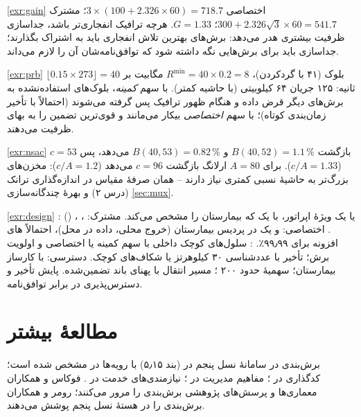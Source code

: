 \documentclass[11pt,a4paper]{article}
\begin{document}
\begin{solutionbox}{\ref{exr:gain}}
اختصاصی $3\times(100 + 2.326\times60) = 718.7$؛ مشترک $300 + 2.326\sqrt3\times60 = 541.7$؛ $G = 1.33$. هرچه ترافیک انفجاری‌تر باشد، جداسازی ظرفیت
بیشتری هدر می‌دهد: برش‌های بهترین تلاش انفجاری باید به اشتراک بگذارند؛ جداسازی باید برای برش‌هایی نگه داشته شود که توافق‌نامه‌شان آن را لازم
می‌داند.
\end{solutionbox}

\begin{solutionbox}{\ref{exr:prb}}
$\lfloor0.15\times273\rfloor = 40$ بلوک (۴۱ با گردکردن)، $R^{\min} = 40\times0.2 = 8$ مگابیت بر ثانیه: ۱۲۵ جریان ۶۴ کیلوبیتی (با حاشیه کمتر). با سهم
\emph{کمینه}، بلوک‌های استفاده‌نشده به برش‌های دیگر قرض داده و هنگام ظهور ترافیک  پس گرفته می‌شوند (احتمالاً با تأخیر زمان‌بندی کوتاه)؛
با سهم \emph{اختصاصی} بیکار می‌مانند و قوی‌ترین تضمین را به بهای ظرفیت می‌دهند.
\end{solutionbox}

\begin{solutionbox}{\ref{exr:nsac}}
بازگشت $B(40,52) = 1.1\,\%$ و $B(40,53) = 0.82\,\%$ می‌دهد، پس $c = 53$ ($c/A = 1.33$). برای $A = 80$ ارلانگ بازگشت $c = 96$ می‌دهد ($c/A = 1.2$):
مخزن‌های بزرگ‌تر به حاشیهٔ نسبی کمتری نیاز دارند -- همان صرفهٔ مقیاس در اندازه‌گذاری ترانک (درس ۲) و بهرهٔ چندگانه‌سازی \cref{sec:mux}.
\end{solutionbox}

\begin{solutionbox}{\ref{exr:design}}
:  () یا یک  ویژهٔ اپراتور، با یک  که بیمارستان را مشخص می‌کند. مشترک: ، ،
. اختصاصی:  و یک  در پردیس بیمارستان (خروج محلی، داده در محل)، احتمالاً های افزونه برای ۹۹٫۹۹٪. :
سلول‌های کوچک داخلی با سهم  کمینه یا اختصاصی و اولویت برش؛ تأخیر با عددشناسی ۳۰ کیلوهرتز یا شکاف‌های کوچک. دسترسی:  با کارساز
 بیمارستان؛ سهمیهٔ  حدود ۲۰۰ ؛ مسیر انتقال با پهنای باند تضمین‌شده. پایش تأخیر و دسترس‌پذیری در برابر توافق‌نامه.
\end{solutionbox}

\section{مطالعهٔ بیشتر}
برش‌بندی در سامانهٔ نسل پنجم در  \cite{ts23501} (بند ۵٫۱۵) با رویه‌ها در  \cite{ts23502} مشخص شده است؛ کدگذاری
 در  \cite{ts23003}؛ مفاهیم مدیریت در  \cite{ts28530}؛ نیازمندی‌های خدمت در  \cite{ts22261}.
فوکاس و همکاران \cite{foukas2017slicing} معماری‌ها و پرسش‌های پژوهشی برش‌بندی را مرور می‌کنند؛ رومر و همکاران \cite{rommer2020core} برش‌بندی را در هستهٔ
نسل پنجم پوشش می‌دهند.

\begin{latin}
\printbibliography[heading=subbibliography,title={References}]
\end{latin}
\end{document}

